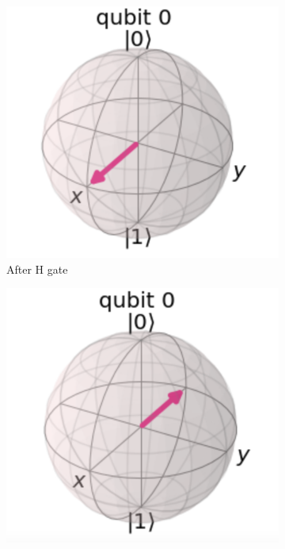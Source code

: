 \begin{figure}[h]
\begin{subfigure}[h]{0.24\textwidth}
        \includegraphics[width=\textwidth]{lab2/images/hzhGate2.png}
        \caption{After H gate}
        \label{fig:hzhGate2}
    \end{subfigure}
        \begin{subfigure}[h]{0.24\textwidth}
        \centering
        \includegraphics[width=\textwidth]{lab2/images/hzhGate3.png}

\end{subfigure}
\end{figure}
